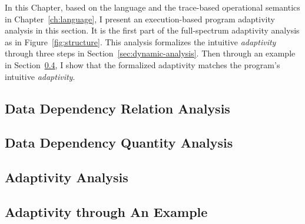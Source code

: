 In this Chapter, based on the language and the trace-based operational semantics in Chapter~\ref{ch:language},
I present an execution-based program adaptivity analysis in this section.
It is the first part of the full-spectrum adaptivity analysis as in Figure~\ref{fig:structure}. 
This analysis formalizes the intuitive \emph{adaptivity} through three steps in 
Section~\ref{sec:dynamic-analysis}.
Then through an example in Section~\ref{sec:dynamic-examples}, I show that the formalized
adaptivity matches the program's intuitive \emph{adaptivity}.
% 

% 


\subsection{Data Dependency Relation Analysis}
\label{sec:dynamic-datadep}


\subsection{Data Dependency Quantity Analysis}
\label{sec:dynamic-reachability}
%

\subsection{Adaptivity Analysis}
\label{sec:dynamic-adapt}
%
%
\subsection{Adaptivity through An Example}
\label{sec:dynamic-examples}


%
